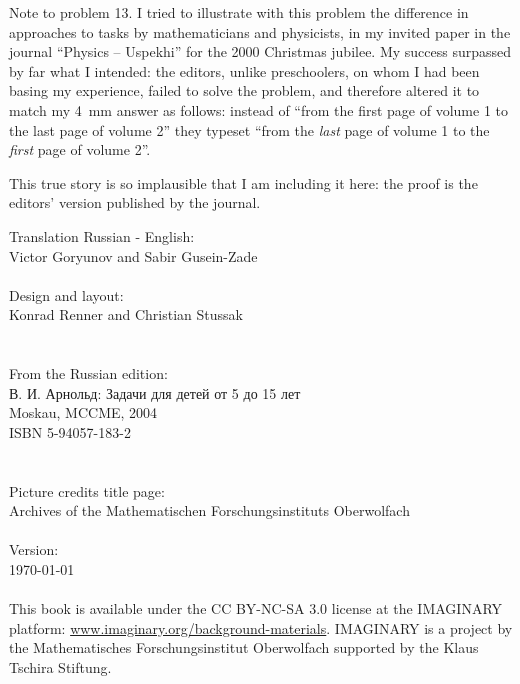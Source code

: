 \vfill
\begin{note}{Note to problem 13.}
	I tried to illustrate with this problem the difference in approaches to tasks by mathematicians and physicists, in my invited paper in the journal \enquote{Physics -- Uspekhi} for the 2000 Christmas jubilee. My success surpassed by far what I intended: the editors, unlike preschoolers, on whom I had been basing my experience, failed to solve the problem, and therefore altered it to match my \SI{4}{\mm} answer as follows: instead of \enquote{from the first page of volume 1 to the last page of volume 2} they typeset \enquote{from the \emph{last} page of volume 1 to the \emph{first} page of volume 2}.

	This true story is so implausible that I am including it here: the proof is the editors' version published by the journal.  
\end{note}
\clearpage
\null\vfill
\noindent
Translation Russian - English:\\
\null\quad Victor Goryunov and Sabir Gusein-Zade\\
\\
Design and layout:\\
\null\quad Konrad Renner and Christian Stussak\\
\\
\\
From the Russian edition:\\
\null\quad \textrussian{В. И. Арнольд: Задачи для детей от 5 до 15 лет}\\
\null\quad Moskau, MCCME, 2004\\
\null\quad ISBN 5-94057-183-2\\
\\
\\
Picture credits title page:\\ 
\null\quad Archives of the Mathematischen Forschungsinstituts Oberwolfach\\
\\
Version:\\
\null\quad \today\\
\\
This book is available under the CC BY-NC-SA 3.0 license at the IMAG\-I\-NARY platform: \href{http://www.imaginary.org/background-materials}{www.imaginary.org/background-materials}. IMAG\-I\-NARY is a project by the Mathematisches Forschungsinstitut Oberwolfach supported by the Klaus Tschira Stiftung.

